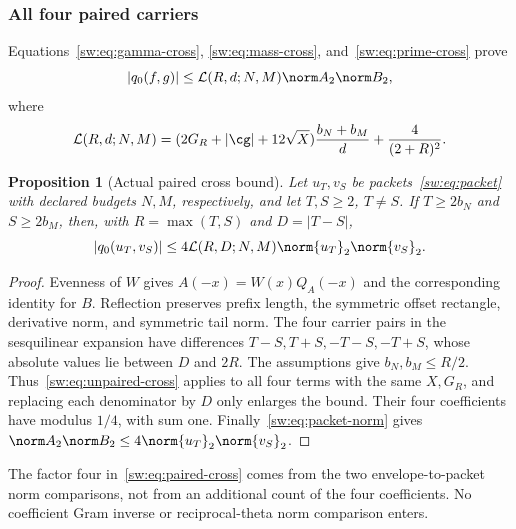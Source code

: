 \documentclass[11pt,a4paper]{article}
\numberwithin{equation}{section}
\newtheorem{proposition}[theorem]{Proposition}
\theoremstyle{definition}\newtheorem{definition}[theorem]{Definition}
\theoremstyle{remark}\newtheorem{remark}[theorem]{Remark}
\begin{document}
\subsubsection{All four paired carriers}
Equations~\eqref{sw:eq:gamma-cross}, \eqref{sw:eq:mass-cross}, and~\eqref{sw:eq:prime-cross} prove
\begin{equation}\label{sw:eq:unpaired-cross}
 |q_0(f,g)|\le\mathcal L(R,d;N,M)\norm A_2\norm B_2,
\end{equation}
where
\begin{equation}\label{sw:eq:Lcross}
 \mathcal L(R,d;N,M)=
 (2G_R+|\cg|+12\sqrt X)\frac{b_N+b_M}d+\frac4{(2+R)^2}.
\end{equation}

\begin{proposition}[Actual paired cross bound]\label{sw:prop:cross}
Let $u_T,v_S$ be packets~\eqref{sw:eq:packet} with declared budgets $N,M$, respectively, and let $T,S\ge2$, $T\ne S$. If $T\ge2b_N$ and $S\ge2b_M$, then, with $R=\max(T,S)$ and $D=|T-S|$,
\begin{equation}\label{sw:eq:paired-cross}
 |q_0(u_T,v_S)|\le4\mathcal L(R,D;N,M)\norm{u_T}_2\norm{v_S}_2.
\end{equation}
\end{proposition}
\begin{proof}
Evenness of $W$ gives $A(-x)=W(x)Q_A(-x)$ and the corresponding identity for $B$. Reflection preserves prefix length, the symmetric offset rectangle, derivative norm, and symmetric tail norm. The four carrier pairs in the sesquilinear expansion have differences $T-S,T+S,-T-S,-T+S$, whose absolute values lie between $D$ and $2R$. The assumptions give $b_N,b_M\le R/2$. Thus~\eqref{sw:eq:unpaired-cross} applies to all four terms with the same $X,G_R$, and replacing each denominator by $D$ only enlarges the bound. Their four coefficients have modulus $1/4$, with sum one. Finally~\eqref{sw:eq:packet-norm} gives $\norm A_2\norm B_2\le4\norm{u_T}_2\norm{v_S}_2$.
\end{proof}
The factor four in~\eqref{sw:eq:paired-cross} comes from the two envelope-to-packet norm comparisons, not from an additional count of the four coefficients. No coefficient Gram inverse or reciprocal-theta norm comparison enters.
\end{document}
